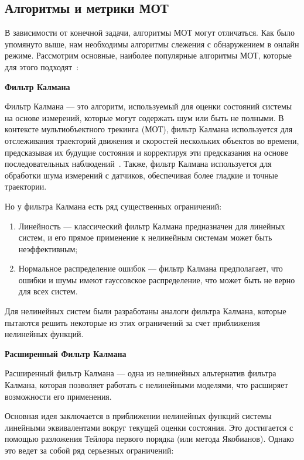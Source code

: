 \subsection{Алгоритмы и метрики МОТ}
В зависимости от конечной задачи, алгоритмы МОТ могут отличаться. Как было упомянуто выше, нам  необходимы алгоритмы слежения с обнаружением в онлайн режиме. Рассмотрим основные, наиболее популярные алгоритмы МОТ, которые для этого подходят~\cite{Article::Luo2021}:

\textbf{Фильтр Калмана}
	
Фильтр Калмана ---  это алгоритм, используемый для оценки состояний системы на основе измерений, которые могут содержать шум или быть не полными. В контексте мультиобъектного трекинга (МОТ), фильтр Калмана используется для отслеживания траекторий движения и скоростей нескольких объектов во времени, предсказывая их будущие состояния и корректируя эти предсказания на основе последовательных наблюдений~\cite{Rodriguez2011}. Также, фильтр Калмана используется для обработки шума измерений с датчиков, обеспечивая более гладкие и точные траектории.

Но у фильтра Калмана есть ряд существенных ограничений: 

\begin{enumerate}

	\item Линейность --- классический фильтр Калмана предназначен для линейных систем, и его прямое применение к нелинейным системам может быть неэффективным;
	
	\item Нормальное распределение ошибок --- фильтр Калмана предполагает, что ошибки и шумы имеют гауссовское распределение, что может быть не верно для всех систем.
	
\end{enumerate}

Для нелинейных систем были разработаны аналоги фильтра Калмана, которые пытаются решить некоторые из этих ограничений за счет приближения нелинейных функций.

\textbf{Расширенный Фильтр Калмана}	
	
Расширенный фильтр Калмана --- одна из нелинейных альтернатив фильтра Калмана, которая позволяет работать с нелинейными моделями, что расширяет возможности его применения. 

Основная идея заключается в приближении нелинейных функций системы линейными эквивалентами вокруг текущей оценки состояния. Это достигается с помощью разложения Тейлора первого порядка (или метода Якобианов). Однако это ведет за собой ряд серьезных ограничений: 

